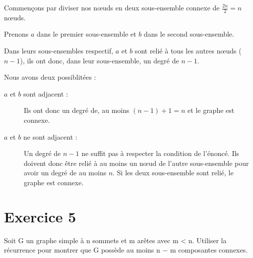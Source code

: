 \documentclass[fontsize=10pt]{article}
\begin{document}
Commençons par diviser nos nœuds en deux sous-ensemble connexe de
$\frac{2n}{2} = n$ nœuds.

Prenons $a$ dans le premier sous-ensemble et $b$
dans le second sous-ensemble.

Dans leurs sous-ensembles respectif, $a$ et $b$
sont relié à tous les autres nœuds ($n-1$), ils ont donc, dans leur sous-ensemble, un
degré de $n - 1$.

Nous avons deux possiblitées :
\begin{description}
    \item [$a$ et $b$ sont adjacent :]
        Ils ont donc un degré de, au moins $(n - 1) + 1 = n$ et le graphe est
        connexe.  \item [$a$ et $b$ ne sont adjacent :] Un degré de $n-1$ ne suffit pas à respecter la condition de l'énoncé.  Ils doivent donc être relié à au moins un nœud de l'autre sous-ensemble
        pour avoir un degré de au moins $n$. Si les deux sous-ensemble sont
        relié, le graphe est connexe.
\end{description}

\section*{Exercice 5}
Soit G un graphe simple à n sommets et m arêtes avec m < n. Utiliser
la récurrence pour montrer que G possède au moins n − m composantes connexes.
\end{document}
